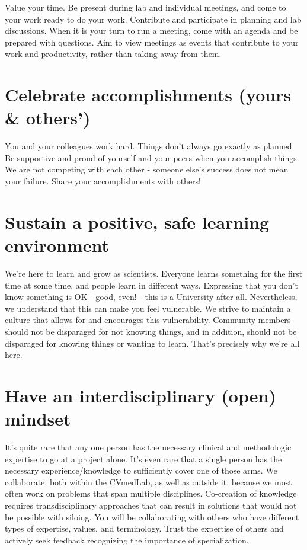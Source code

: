 \documentclass[
  letterpaper,
  DIV=11,
  numbers=noendperiod]{scrreprt}
\begin{document}
Value your time. Be present during lab and individual meetings, and come
to your work ready to do your work. Contribute and participate in
planning and lab discussions. When it is your turn to run a meeting,
come with an agenda and be prepared with questions. Aim to view meetings
as events that contribute to your work and productivity, rather than
taking away from them.

\hypertarget{celebrate-accomplishments-yours-others}{%
\section{Celebrate accomplishments (yours \&
others')}\label{celebrate-accomplishments-yours-others}}

You and your colleagues work hard. Things don't always go exactly as
planned. Be supportive and proud of yourself and your peers when you
accomplish things. We are not competing with each other - someone else's
success does not mean your failure. Share your accomplishments with
others!

\hypertarget{sustain-a-positive-safe-learning-environment}{%
\section{Sustain a positive, safe learning
environment}\label{sustain-a-positive-safe-learning-environment}}

We're here to learn and grow as scientists. Everyone learns something
for the first time at some time, and people learn in different ways.
Expressing that you don't know something is OK - good, even! - this is a
University after all. Nevertheless, we understand that this can make you
feel vulnerable. We strive to maintain a culture that allows for and
encourages this vulnerability. Community members should not be
disparaged for not knowing things, and in addition, should not be
disparaged for knowing things or wanting to learn. That's precisely why
we're all here.

\hypertarget{have-an-interdisciplinary-open-mindset}{%
\section{Have an interdisciplinary (open)
mindset}\label{have-an-interdisciplinary-open-mindset}}

It's quite rare that any one person has the necessary clinical and
methodologic expertise to go at a project alone. It's even rare that a
single person has the necessary experience/knowledge to sufficiently
cover one of those arms. We collaborate, both within the CVmedLab, as
well as outside it, because we most often work on problems that span
multiple disciplines. Co-creation of knowledge requires
transdisciplinary approaches that can result in solutions that would not
be possible with siloing. You will be collaborating with others who have
different types of expertise, values, and terminology. Trust the
expertise of others and actively seek feedback recognizing the
importance of specialization.
\end{document}
